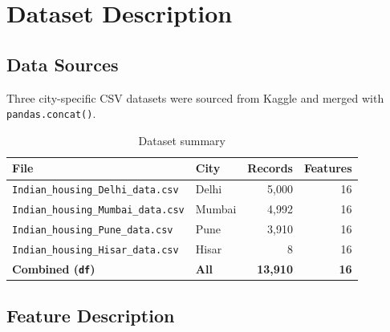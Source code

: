 \documentclass[12pt,a4paper]{article}
\newcommand{\TH}[1]{\cellcolor{TblHead}\color{white}\sffamily\bfseries\small #1}
\newcommand{\RA}{\cellcolor{RowA}}
\newcommand{\RB}{\cellcolor{RowB}}
\begin{document}
\section{Dataset Description}

\subsection{Data Sources}
Three city-specific CSV datasets were sourced from Kaggle and merged with
\texttt{pandas.concat()}.

\begin{table}[H]\centering
  \caption{Dataset summary}
  \begin{tabular}{llrr}
    \toprule
    \TH{File} & \TH{City} & \TH{Records} & \TH{Features} \\
    \midrule
    \RA\texttt{Indian\_housing\_Delhi\_data.csv}  & Delhi  & 5{,}000  & 16 \\
    \RB\texttt{Indian\_housing\_Mumbai\_data.csv} & Mumbai & 4{,}992  & 16 \\
    \RA\texttt{Indian\_housing\_Pune\_data.csv}   & Pune   & 3{,}910  & 16 \\
    \RB\texttt{Indian\_housing\_Hisar\_data.csv}  & Hisar  & 8        & 16 \\
    \midrule
    \cellcolor{MidBlue}\textbf{Combined (\texttt{df})} &
    \cellcolor{MidBlue}\textbf{All} &
    \cellcolor{MidBlue}\textbf{13{,}910} &
    \cellcolor{MidBlue}\textbf{16} \\
    \bottomrule
  \end{tabular}
\end{table}

\subsection{Feature Description}
\end{document}
